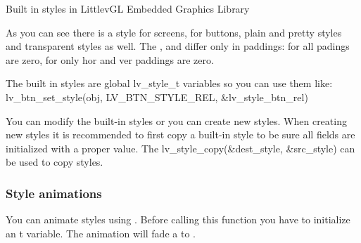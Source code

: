 \documentclass[letterpaper,10pt,english]{sphinxmanual}
\begin{document}
Built in styles in LittlevGL Embedded Graphics Library

As you can see there is a style for screens, for buttons, plain and pretty styles and transparent styles as well. The ,  and  differ only in paddings: for  all padings are zero, for  only hor and ver paddings are zero.

The built in styles are global lv\_style\_t variables so you can use them like: lv\_btn\_set\_style(obj, LV\_BTN\_STYLE\_REL, \&lv\_style\_btn\_rel)

You can modify the built-in styles or you can create new styles. When creating new styles it is recommended to first copy a built-in style to be sure all fields are initialized with a proper value. The lv\_style\_copy(\&dest\_style, \&src\_style) can be used to copy styles.


\subsubsection{Style animations}
\label{\detokenize{overview/styles:style-animations}}
You can animate styles using . Before calling this function you have to initialize an t variable. The animation will fade a  to .
\end{document}
